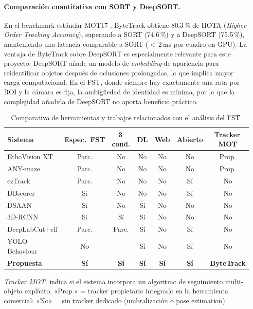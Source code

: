 \paragraph{Comparación cuantitativa con SORT y DeepSORT.}
En el benchmark estándar MOT17 \cite{zhang2022_bytetrack}, ByteTrack
obtiene 80.3\,\% de HOTA (\textit{Higher Order Tracking Accuracy}),
superando a SORT \cite{bewley2016_sort} (74.6\,\%) y a DeepSORT
\cite{wojke2017_deepsort} (75.5\,\%), manteniendo una latencia comparable a
SORT ($<$\,2\,ms por cuadro en GPU). La ventaja de ByteTrack sobre DeepSORT
es especialmente relevante para este proyecto: DeepSORT añade un modelo de
\textit{embedding} de apariencia para reidentificar objetos después de
oclusiones prolongadas, lo que implica mayor carga computacional. En el FST,
donde siempre hay exactamente una rata por ROI y la cámara es fija, la
ambigüedad de identidad es mínima, por lo que la complejidad añadida de
DeepSORT no aporta beneficio práctico.

%

\begin{table}[ht]
\centering
\caption{Comparativa de herramientas y trabajos relacionados con el análisis del FST.}
\label{tab:comparativa_herramientas}
\small
\begin{tabular}{lcccccc}
\hline
\textbf{Sistema} & \textbf{Espec.\ FST} & \textbf{3\,cond.} &
\textbf{DL} & \textbf{Web} & \textbf{Abierto} & \textbf{Tracker\,MOT} \\
\hline
EthoVision XT   & Parc. & No    & No  & No  & No  & Prop. \\
ANY-maze        & Parc. & No    & No  & No  & No  & Prop. \\
ezTrack         & Parc. & No    & No  & No  & Sí  & No     \\
DBscorer        & Sí    & No    & No  & No  & Sí  & No     \\
DSAAN           & Sí    & No    & Sí  & No  & No  & No     \\
3D-RCNN         & Sí    & Sí    & Sí  & No  & No  & No     \\
DeepLabCut+clf  & Parc. & Parc. & Sí  & No  & Sí  & No     \\
YOLO-Behaviour  & No    & ---   & Sí  & No  & Sí  & No     \\
\hline
\textbf{Propuesta} & \textbf{Sí} & \textbf{Sí} & \textbf{Sí} &
\textbf{Sí} & \textbf{Sí} & \textbf{ByteTrack} \\
\hline
\end{tabular}
\smallskip

\noindent\footnotesize
\textit{Tracker MOT}: indica si el sistema incorpora un algoritmo de
seguimiento multi-objeto explícito. «Prop.» = tracker propietario integrado
en la herramienta comercial; «No» = sin tracker dedicado (umbralización
o pose estimation).
\end{table}


